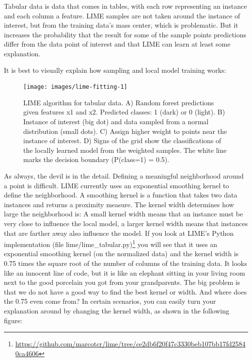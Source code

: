 \documentclass[
  12pt,
]{krantz}
\renewcommand{\href}[2]{#2\footnote{\url{#1}}}
\begin{document}
Tabular data is data that comes in tables, with each row representing an instance and each column a feature.
LIME samples are not taken around the instance of interest, but from the training data's mass center, which is problematic.
But it increases the probability that the result for some of the sample points predictions differ from the data point of interest and that LIME can learn at least some explanation.

It is best to visually explain how sampling and local model training works:

\begin{figure}

{\centering \texttt{[image: images/lime-fitting-1]} 

}

\caption{LIME algorithm for tabular data. A) Random forest predictions given features x1 and x2. Predicted classes: 1 (dark) or 0 (light). B) Instance of interest (big dot) and data sampled from a normal distribution (small dots). C) Assign higher weight to points near the instance of interest. D) Signs of the grid show the classifications of the locally learned model from the weighted samples. The white line marks the decision boundary (P(class=1) = 0.5).}\label{fig:lime-fitting}
\end{figure}

As always, the devil is in the detail.
Defining a meaningful neighborhood around a point is difficult.
LIME currently uses an exponential smoothing kernel to define the neighborhood.
A smoothing kernel is a function that takes two data instances and returns a proximity measure.
The kernel width determines how large the neighborhood is:
A small kernel width means that an instance must be very close to influence the local model, a larger kernel width means that instances that are farther away also influence the model.
If you look at \href{https://github.com/marcotcr/lime/tree/ce2db6f20f47c3330beb107bb17fd25840ca4606}{LIME's Python implementation (file lime/lime\_tabular.py)} you will see that it uses an exponential smoothing kernel (on the normalized data) and the kernel width is 0.75 times the square root of the number of columns of the training data.
It looks like an innocent line of code, but it is like an elephant sitting in your living room next to the good porcelain you got from your grandparents.
The big problem is that we do not have a good way to find the best kernel or width.
And where does the 0.75 even come from?
In certain scenarios, you can easily turn your explanation around by changing the kernel width, as shown in the following figure:
\end{document}
